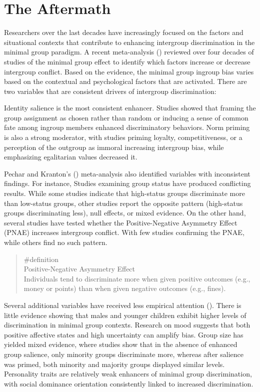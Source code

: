 \documentclass[
  letterpaper,
]{book}
\begin{document}
\section{The Aftermath}\label{the-aftermath-16}

Researchers over the last decades have increasingly focused on the
factors and situational contexts that contribute to enhancing intergroup
discrimination in the minimal group paradigm. A recent meta-analysis
()
reviewed over four decades of studies of the minimal group effect to
identify which factors increase or decrease intergroup conflict. Based
on the evidence, the minimal group ingroup bias varies based on the
contextual and psychological factors that are activated. There are two
variables that are consistent drivers of intergroup discrimination:

Identity salience is the most consistent enhancer. Studies showed that
framing the group assignment as chosen rather than random or inducing a
sense of common fate among ingroup members enhanced discriminatory
behaviors. Norm priming is also a strong moderator, with studies priming
loyalty, competitiveness, or a perception of the outgroup as immoral
increasing intergroup bias, while emphasizing egalitarian values
decreased it.

Pechar and Kranton's () meta-analysis also identified variables with
inconsistent findings. For instance, Studies examining group status have
produced conflicting results. While some studies indicate that
high-status groups discriminate more than low-status groups, other
studies report the opposite pattern (high-status groups discriminating
less), null effects, or mixed evidence. On the other hand, several
studies have tested whether the Positive-Negative Asymmetry Effect
(PNAE) increases intergroup conflict. With few studies confirming the
PNAE, while others find no such pattern.

\begin{quote}
\label{def-pnae}{\#definition}\\
Positive-Negative Asymmetry Effect\\
Individuals tend to discriminate more when given positive outcomes
(e.g., money or points) than when given negative outcomes (e.g., fines).
\end{quote}

Several additional variables have received less empirical attention
(). There
is little evidence showing that males and younger children exhibit
higher levels of discrimination in minimal group contexts. Research on
mood suggests that both positive affective states and high uncertainty
can amplify bias. Group size has yielded mixed evidence, where studies
show that in the absence of enhanced group salience, only minority
groups discriminate more, whereas after salience was primed, both
minority and majority groups displayed similar levels. Personality
traits are relatively weak enhancers of minimal group discrimination,
with social dominance orientation consistently linked to increased
discrimination.
\end{document}
